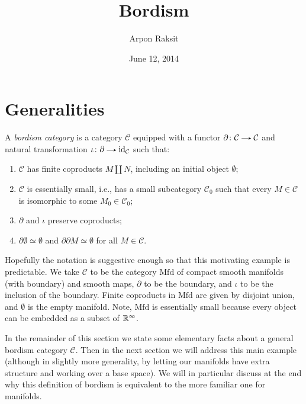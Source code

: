 

\title{Bordism}
\author{Arpon Raksit}
\date{June 12, 2014}


\maketitle
\thispagestyle{fancy}


\renewcommand{\d}{\partial}
\newcommand{\e}{\emptyset}
\newcommand{\Mfd}{\mathrm{Mfd}}
\renewcommand{\C}{\mathcal{C}}


\section{Generalities}

\begin{definition}
  A \emph{bordism category} is a category $\C$ equipped with a functor
  $\d \c \C \to \C$ and natural transformation $\iota \c \d \to
  \id_\C$ such that:
  \begin{enumerate}
  \item $\C$ has finite coproducts $M \amalg N$, including an initial
    object $\e$;
  \item $\C$ is essentially small, i.e., has a small subcategory
    $\C_0$ such that every $M \in \C$ is isomorphic to some $M_0 \in
    \C_0$;
  \item $\d$ and $\iota$ preserve coproducts;
  \item $\d\e \simeq \e$ and $\d\d M \simeq \e$ for all $M \in \C$.
  \end{enumerate}
\end{definition}

\begin{example} \label{main-example}
  Hopefully the notation is suggestive enough so that this motivating
  example is predictable. We take $\C$ to be the category $\Mfd$ of
  compact smooth manifolds (with boundary) and smooth maps, $\d$ to be
  the boundary, and $\iota$ to be the inclusion of the
  boundary. Finite coproducts in $\Mfd$ are given by disjoint union,
  and $\e$ is the empty manifold. Note, $\Mfd$ is essentially small
  because every object can be embedded as a subset of $\mathbb{R}^\infty$.
\end{example}

In the remainder of this section we state some elementary facts about
a general bordism category $\C$. Then in the next section we will
address this main example (although in slightly more generality, by
letting our manifolds have extra structure and working over a base
space). We will in particular discuss at the end why this definition
of bordism is equivalent to the more familiar one for manifolds.

